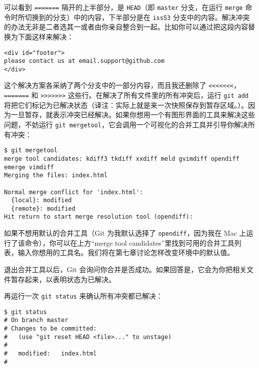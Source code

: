 \documentclass[a4paper]{book}
\begin{document}
可以看到 \texttt{=======} 隔开的上半部分，是 \texttt{HEAD}（即 \texttt{master} 分支，在运行 \texttt{merge} 命令时所切换到的分支）中的内容，下半部分是在 \texttt{iss53} 分支中的内容。解决冲突的办法无非是二者选其一或者由你亲自整合到一起。比如你可以通过把这段内容替换为下面这样来解决：

\begin{shaded}\begin{verbatim}
<div id="footer">
please contact us at email.support@github.com
</div>
\end{verbatim}\end{shaded}

这个解决方案各采纳了两个分支中的一部分内容，而且我还删除了 \texttt{\textless{}\textless{}\textless{}\textless{}\textless{}\textless{}\textless{}}，\texttt{=======} 和 \texttt{\textgreater{}\textgreater{}\textgreater{}\textgreater{}\textgreater{}\textgreater{}\textgreater{}} 这些行。在解决了所有文件里的所有冲突后，运行 \texttt{git add} 将把它们标记为已解决状态（译注：实际上就是来一次快照保存到暂存区域。）。因为一旦暂存，就表示冲突已经解决。如果你想用一个有图形界面的工具来解决这些问题，不妨运行 \texttt{git mergetool}，它会调用一个可视化的合并工具并引导你解决所有冲突：

\begin{shaded}\begin{verbatim}
$ git mergetool
merge tool candidates: kdiff3 tkdiff xxdiff meld gvimdiff opendiff emerge vimdiff
Merging the files: index.html

Normal merge conflict for 'index.html':
  {local}: modified
  {remote}: modified
Hit return to start merge resolution tool (opendiff):
\end{verbatim}\end{shaded}

如果不想用默认的合并工具（Git 为我默认选择了 \texttt{opendiff}，因为我在 Mac 上运行了该命令），你可以在上方“merge tool candidates”里找到可用的合并工具列表，输入你想用的工具名。我们将在第七章讨论怎样改变环境中的默认值。

退出合并工具以后，Git 会询问你合并是否成功。如果回答是，它会为你把相关文件暂存起来，以表明状态为已解决。

再运行一次 \texttt{git status} 来确认所有冲突都已解决：

\begin{shaded}\begin{verbatim}
$ git status
# On branch master
# Changes to be committed:
#   (use "git reset HEAD <file>..." to unstage)
#
#	modified:   index.html
#
\end{verbatim}\end{shaded}
\end{document}
